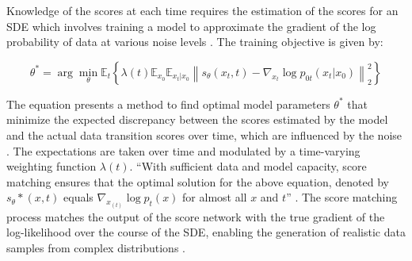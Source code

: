 Knowledge of the scores at each time requires the estimation of the scores for an SDE which involves training a model to approximate the gradient of the log probability of data at various noise levels \citep{song2020score}. The training objective is given by:

\[
\theta^* = \arg\min_\theta \mathbb{E}_t \left\{ \lambda(t) \mathbb{E}_{x_0} \mathbb{E}_{x_t|x_0} \left\| s_\theta(x_t, t) - \nabla_{x_t} \log p_{0t}(x_t | x_0) \right\|_2^2 \right\}
\]

\citep{song2020score} The equation presents a method to find optimal model parameters \( \theta^* \) that minimize the expected discrepancy between the scores estimated by the model and the actual data transition scores over time, which are influenced by the noise \citep{song2020score}. The expectations are taken over time and modulated by a time-varying weighting function \( \lambda(t) \). ``With sufficient data and model capacity, score matching ensures that the optimal solution for the above equation, denoted by \(s_\theta*(x, t)\) equals \(\nabla_{x_(t)} \log p_{t}(x)\) for almost all \( x \) and \( t \)'' \citep{song2020score}. The score matching process matches the output of the score network with the true gradient of the log-likelihood over the course of the SDE, enabling the generation of realistic data samples from complex distributions \citep{yangdiffusionSummary}.
